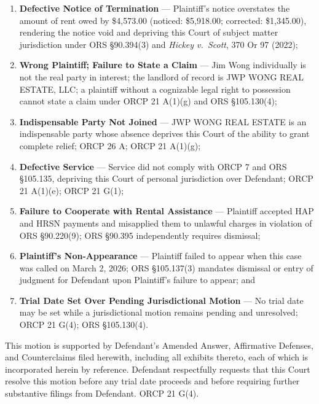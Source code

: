 \documentclass[12pt,letterpaper]{article}
\begin{document}
	\begin{enumerate}
		\item \textbf{Defective Notice of Termination} --- Plaintiff's notice overstates the amount of rent owed by \$4,573.00 (noticed: \$5,918.00; corrected: \$1,345.00), rendering the notice void and depriving this Court of subject matter jurisdiction under ORS \S90.394(3) and \textit{Hickey v.\ Scott}, 370 Or 97 (2022);
		
		\item \textbf{Wrong Plaintiff; Failure to State a Claim} --- Jim Wong individually is not the real party in interest; the landlord of record is JWP WONG REAL ESTATE, LLC; a plaintiff without a cognizable legal right to possession cannot state a claim under ORCP 21 A(1)(g) and ORS \S105.130(4);
		
		\item \textbf{Indispensable Party Not Joined} --- JWP WONG REAL ESTATE is an indispensable party whose absence deprives this Court of the ability to grant complete relief; ORCP 26 A; ORCP 21 A(1)(g);
		
		\item \textbf{Defective Service} --- Service did not comply with ORCP 7 and ORS \S105.135, depriving this Court of personal jurisdiction over Defendant; ORCP 21 A(1)(e); ORCP 21 G(1);
		
		\item \textbf{Failure to Cooperate with Rental Assistance} --- Plaintiff accepted HAP and HRSN payments and misapplied them to unlawful charges in violation of ORS \S90.220(9); ORS \S90.395 independently requires dismissal;
		
		\item \textbf{Plaintiff's Non-Appearance} --- Plaintiff failed to appear when this case was called on March 2, 2026; ORS \S105.137(3) mandates dismissal or entry of judgment for Defendant upon Plaintiff's failure to appear; and
		
		\item \textbf{Trial Date Set Over Pending Jurisdictional Motion} --- No trial date may be set while a jurisdictional motion remains pending and unresolved; ORCP 21 G(4); ORS \S105.130(4).
	\end{enumerate}
	
	This motion is supported by Defendant's Amended Answer, Affirmative Defenses, and Counterclaims filed herewith, including all exhibits thereto, each of which is incorporated herein by reference. Defendant respectfully requests that this Court resolve this motion before any trial date proceeds and before requiring further substantive filings from Defendant. ORCP 21 G(4).
	
\end{document}
